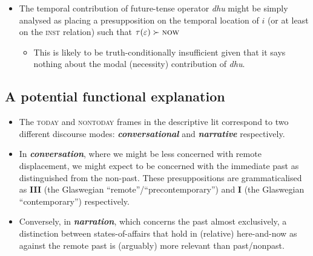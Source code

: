 \documentclass[11pt,dvipsnames]{article}
\begin{document}
\begin{itemize}
\item The temporal contribution of future-tense operator \textit{dhu} might be simply analysed as placing a presupposition on the temporal location of $ i $ (or at least on the \textsc{inst} relation) such that $ \tau(\varepsilon)\succ \textsc{now} $
\begin{itemize}
	\item This is likely to be truth-conditionally insufficient given that it says nothing about the modal (necessity) contribution of \textit{dhu}.
\end{itemize}

\end{itemize}

\subsection*{A potential functional explanation}
\begin{itemize}

\item The \textsc{today} and \textsc{nontoday} frames in the descriptive lit correspond to two different discourse modes: \textbf{\textit{conversational}} and \textbf{\textit{narrative}} respectively.
\item  In \textbf{\textit{conversation}}, where we might be less concerned with remote displacement, we might expect to be concerned with the immediate past as distinguished from the non-past. These presuppositions are grammaticalised as \textbf{III} (the Glaswegian ``remote''/``precontemporary'') and \textbf{I} (the Glaswegian ``contemporary'') respectively.
\item  Conversely, in \textbf{\textit{narration}}, which concerns the past almost exclusively, a distinction between states-of-affairs that hold in (relative) here-and-now as against the remote past is (arguably) more relevant than past/nonpast.
\end{itemize}
\end{document}
